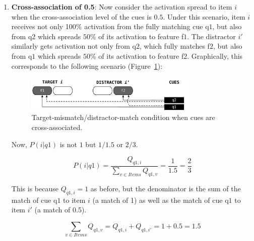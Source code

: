 \documentclass{cambridge7A}\usepackage[]{graphicx}\usepackage[]{color}
\begin{document}
\begin{enumerate}
\item \textbf{Cross-association of 0.5}:
Now consider the activation spread to item $i$ when the cross-association level of the cues is $0.5$. Under this scenario, item $i$ receives not only 100\%  activation from the fully matching cue q$1$, but also from q$2$ which spreads $50\%$ of its activation to feature f$1$. The distractor $i'$ similarly gets activation not only from  q$2$, which fully matches  f$2$, but also from  q$1$ which spreads $50\%$ of its activation to feature f$2$.   Graphically, this corresponds to the following scenario (Figure~\ref{fig:implFig2}):

\begin{figure}[htbp]
	\centering
	\includegraphics[width=0.80\textwidth]{figures/implFig2}
	\caption{Target-mismatch/distractor-match condition when cues are cross-associated.}
	\label{fig:implFig2}
\end{figure}





Now, $P(i|q1)$ is not $1$ but $1/1.5$ or $2/3$.  

\begin{equation} \label{eq:newfannoxassoc3}
	P(i|q1) = \frac{Q_{q1,i}}{\sum\limits_{v\in Items} Q_{q1,v}} = \frac{1}{1.5} = \frac{2}{3}
\end{equation}

This is because $Q_{q1,i} = 1$  as before, but the denominator is the sum of the match of cue q$1$ to item $i$ (a match of 1) as well as the match of cue q$1$ to item $i'$ (a match of 0.5).

\begin{equation}
\sum\limits_{v\in Items} Q_{q1,v} = Q_{q1,i} + Q_{q1,i'} = 1 + 0.5 = 1.5
\end{equation}


\end{enumerate}
\end{document}
